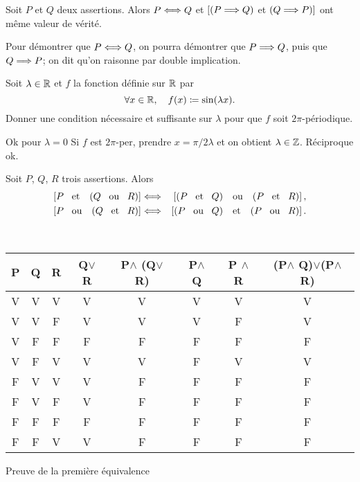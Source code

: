\documentclass{magnoliaold}
\begin{document}
\begin{proposition}[utile=-3]
Soit $P$ et $Q$ deux assertions. Alors $P\Longleftrightarrow Q$ et $[\left(P\Longrightarrow Q\right)$ et
$\left(Q \Longrightarrow P\right)]$ ont même valeur de vérité.
\end{proposition}

\begin{remarqueUnique}
\remarque Pour démontrer que $P\Longleftrightarrow Q$, on pourra démontrer que
  $P\Longrightarrow Q$, puis que $Q\Longrightarrow P$; on dit qu'on raisonne par
  double implication.
\end{remarqueUnique}

\begin{exoUnique}
\exo Soit $\lambda\in\mathbb{R}$ et $f$ la fonction définie sur $\mathbb{R}$ par
  \[\forall x\in\mathbb{R} ,\quad f(x)\coloneqq \sin(\lambda x).\]
  Donner une condition nécessaire et suffisante sur $\lambda$ pour que
  $f$ soit $2\pi$-périodique.
\end{exoUnique}

\begin{sol}
Ok pour $\lambda=0$
Si $f$ est $2\pi$-per, prendre $x=\pi/2\lambda$ et on obtient $\lambda\in\mathbb{Z}$. Réciproque ok.
\end{sol}

\begin{proposition}[utile=-3]
Soit $P$, $Q$, $R$ trois assertions. Alors
\begin{eqnarray*}
\cro{P \et \p{Q \ou R}} &\ssi& \cro{\p{P \et Q} \ou \p{P \et R}},\\
\cro{P \ou \p{Q \et R}} &\ssi& \cro{\p{P \ou Q} \et \p{P \ou R}}.
\end{eqnarray*}
\end{proposition}

\begin{preuve}

~~
\begin{center}
  \begin{tabular}{|c|c|c|c|c|c|c|c|}
  \hline
  P & Q & R & Q$\lor$ R & P$\wedge$ (Q$\lor$ R) & P$\wedge$ Q & P $\wedge$ R & (P$\wedge$ Q)$\lor$(P$\wedge$ R) \\
  \hline
  V &V & V &V &V &V &V &V \\
  \hline
  V & V & F & V &V &V &F & V \\
  \hline
  V& F & F & F &F &F &F & F \\
  \hline
  V & F & V & V &V &F &V & V \\
  \hline
  F & V & V & V &F &F &F & F \\
  \hline
  F & V & F & V &F &F &F & F \\
  \hline
  F &F &F & F &F &F &F & F \\
  \hline
  F &F &V & V &F &F &F & F \\
  \hline
  \end{tabular}
  Preuve de la première équivalence
  
\end{center}
\end{preuve}
\end{document}
